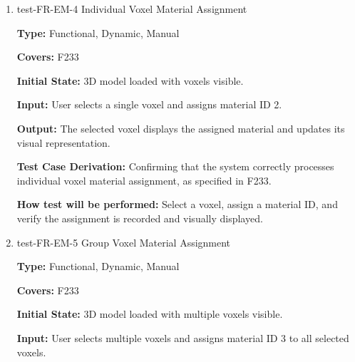 \documentclass[12pt, titlepage]{article}
\begin{document}
\begin{enumerate}
\textbf{Type:} Functional, Dynamic, Manual

\textbf{Covers:} F232
					
\textbf{Initial State:} Editing Manager with favourite bar accessible.
					
\textbf{Input:} User creates a favourite magnetization vector (x=0.5, y=0.5, z=0.0) and saves it to the favourite bar.
					
\textbf{Output:} The magnetization vector is added to the favourite bar and can be selected for future use.

\textbf{Test Case Derivation:} Validates that users can maintain and reuse frequently used magnetization vectors, per F232.
					
\textbf{How test will be performed:} Create a favourite magnetization vector, save it to the favourite bar, and verify it can be selected and applied to voxels.

\item{test-FR-EM-4 Individual Voxel Material Assignment\\}
\label{sec:t-em-4}

\textbf{Type:} Functional, Dynamic, Manual

\textbf{Covers:} F233
					
\textbf{Initial State:} 3D model loaded with voxels visible.
					
\textbf{Input:} User selects a single voxel and assigns material ID 2.
					
\textbf{Output:} The selected voxel displays the assigned material and updates its visual representation.

\textbf{Test Case Derivation:} Confirming that the system correctly processes individual voxel material assignment, as specified in F233.
					
\textbf{How test will be performed:} Select a voxel, assign a material ID, and verify the assignment is recorded and visually displayed.

\item{test-FR-EM-5 Group Voxel Material Assignment\\}
\label{sec:t-em-5}

\textbf{Type:} Functional, Dynamic, Manual

\textbf{Covers:} F233
					
\textbf{Initial State:} 3D model loaded with multiple voxels visible.
					
\textbf{Input:} User selects multiple voxels and assigns material ID 3 to all selected voxels.
					

\end{enumerate}
\end{document}
